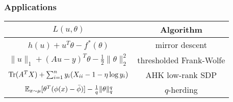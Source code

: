 \documentclass{beamer}
\begin{document}

\begin{frame}
\frametitle{Applications}
\begin{tabular}{|c|c|}
\hline
$L(u,\theta)$ & Algorithm \\ \hline
$h(u) + u^T\theta - f^*(\theta)$ & mirror descent \\ \hline
$\|u\|_1 + (Au-y)^T\theta - \frac{1}{2}\|\theta\|_2^2$ & thresholded Frank-Wolfe \\ \hline
$\operatorname{Tr}(A^TX) + \sum_{i=1}^n y_i(X_{ii} -1 -\eta \log y_i)$ & AHK low-rank SDP \\ \hline
$\mathbb{E}_{x \sim \mu}[\theta^T(\phi(x)-\bar{\phi})] - \frac{1}{q}\|\theta\|_q^q$ & $q$-herding \\ \hline
\end{tabular}
\end{frame}
\end{document}
